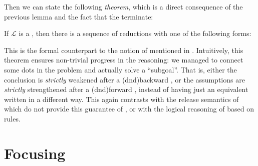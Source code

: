 \begin{scope}
Then we can state the following \emph{ theorem}, which is a direct
consequence of the previous lemma and the fact that the 
terminate:

\begin{theorem}[Productivity]
If $\mathcal{L}$ is a  , then there
is a sequence of reductions with one of the following forms:
\end{theorem}

This is the formal counterpart to the notion of  mentioned in
. Intuitively, this theorem ensures non-trivial progress in the
reasoning: we managed to connect some dots in the problem and actually solve a
``subgoal''. That is, either the conclusion is \emph{strictly} weakened after a
\kl(dnd){backward} , or the assumptions are \emph{strictly} strengthened
after a \kl(dnd){forward} , instead of having just an equivalent
 written in a different way. This again contrasts with the release semantics of
 which do not provide this guarantee of
, or with the logical reasoning  of  based on  rules.

\section{Focusing}


\end{scope}
